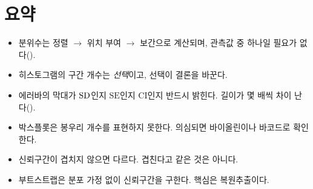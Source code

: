 \section{요약}

\begin{itemize}
  \item 분위수는 정렬 $\rightarrow$ 위치 부여 $\rightarrow$ 보간으로 계산되며,
        관측값 중 하나일 필요가 없다().
  \item 히스토그램의 구간 개수는 \emph{선택}이고, 선택이 결론을 바꾼다.
  \item 에러바의 막대가 $\mathrm{SD}$인지 $\mathrm{SE}$인지 $\mathrm{CI}$인지 반드시
        밝힌다. 길이가 몇 배씩 차이 난다().
  \item 박스플롯은 봉우리 개수를 표현하지 못한다. 의심되면 바이올린이나 바코드로
        확인한다.
  \item 신뢰구간이 겹치지 않으면 다르다. 겹친다고 같은 것은 아니다.
  \item 부트스트랩은 분포 가정 없이 신뢰구간을 구한다. 핵심은 복원추출이다.
\end{itemize}

